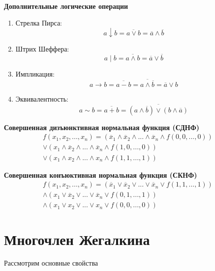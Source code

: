 \textbf{Дополнительные логические операции}

\begin{enumerate}
    \item Стрелка Пирса:
        \begin{equation}
            a \downarrow b = \overline{a \lor b} = \overline a \land \overline b
        \end{equation}
    \item Штрих Шеффера:
        \begin{equation}
            a \mid b = \overline{a \land b} = \overline a \lor \overline b
        \end{equation}
    \item Импликация:
        \begin{equation}
            a \rightarrow b = \overline{a - b} = \overline{a \land \overline b} = \overline a \lor b
        \end{equation}
    \item Эквивалентность:
        \begin{equation}
            a \sim b = \overline{a + b} = \overline{(a \land \overline b) \lor (b \land \overline a)}
        \end{equation}
\end{enumerate}

\textbf{Совершенная дизъюнктивная нормальная функция (СДНФ)}
\begin{multline}
    f(x_1, x_2, ..., x_n) = (\overline x_1 \land \overline x_2 \land ... \land \overline x_n \land f(0, 0, ..., 0)) \\
    \lor (x_1 \land \overline x_2 \land ... \land \overline x_n \land f(1, 0, ..., 0)) \\
    \lor (x_1 \land x_2 \land ... \land x_n \land f(1, 1, ..., 1))
\end{multline}

\textbf{Совершенная конъюктивная нормальная функция (СКНФ)}
\begin{multline}
    f(x_1, x_2, ..., x_n) = (\overline x_1 \lor \overline x_2 \lor ... \lor \overline x_n \lor f(1, 1, ..., 1)) \\
    \land (x_1 \lor \overline x_2 \lor ... \lor \overline x_n \lor f(0, 1, ..., 1)) \\
    \land (x_1 \lor x_2 \lor ... \lor x_n \lor f(0, 0, ..., 0))
\end{multline}

\section{Многочлен Жегалкина}
Рассмотрим основные свойства

